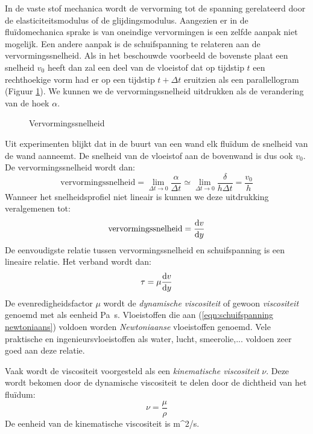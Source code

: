 In de vaste stof mechanica wordt de vervorming tot de spanning gerelateerd door de elasticiteitsmodulus of de glijdingsmodulus. Aangezien er in de fluïdomechanica sprake is van oneindige vervormingen is een zelfde aanpak niet mogelijk. Een andere aanpak is de schuifspanning te relateren aan de vervormingssnelheid. Als in het beschouwde voorbeeld de bovenste plaat een snelheid $v_0$ heeft dan zal een deel van de vloeistof dat op tijdstip $t$ een rechthoekige vorm had er op een tijdstip $t+\Delta t$ eruitzien als een parallellogram (Figuur \ref{fig:Vervormingssnelheid}). We kunnen we de vervormingssnelheid uitdrukken als de verandering van de hoek $\alpha$.
\begin{figure}[htb]
	\centering
	
	\caption{Vervormingssnelheid}
	\label{fig:Vervormingssnelheid}
\end{figure}
Uit experimenten blijkt dat in de buurt van een wand elk fluïdum de snelheid van de wand aanneemt. De snelheid van de vloeistof aan de bovenwand is dus ook $v_0$. De vervormingssnelheid wordt dan:
\begin{equation}
	\text{vervormingssnelheid} = \lim_{\Delta t \to 0} \frac{\alpha}{\Delta t} \simeq \lim_{\Delta t \to 0} \frac{\delta}{h \Delta t} = \frac{v_0}{h}
\end{equation}
Wanneer het snelheidsprofiel niet lineair is kunnen we deze uitdrukking veralgemenen tot:
\begin{equation}
	\text{vervormingssnelheid} = \frac{\mathrm{d} v}{\mathrm{d} y}
\end{equation}
De eenvoudigste relatie tussen vervormingssnelheid en schuifspanning is een lineaire relatie. Het verband wordt dan:
\begin{equation}
	\tau = \mu \frac{\mathrm{d} v}{\mathrm{d} y}
	\label{eqn:schuifspanning newtoniaans}
\end{equation}
De evenredigheidsfactor $\mu$ wordt de \emph{dynamische viscositeit} of gewoon \emph{viscositeit} genoemd met als eenheid \unit{}{Pa\ s}. Vloeistoffen die aan (\ref{eqn:schuifspanning newtoniaans}) voldoen worden \emph{Newtoniaanse} vloeistoffen genoemd. Vele praktische en ingenieursvloeistoffen als water, lucht, smeerolie,... voldoen zeer goed aan deze relatie.

Vaak wordt de viscositeit voorgesteld als een \emph{kinematische viscositeit} $\nu$. Deze wordt bekomen door de dynamische viscositeit te delen door de dichtheid van het fluïdum:
\begin{equation}
	\nu = \frac{\mu}{\rho}
\end{equation}
De eenheid van de kinematische viscositeit is \unit{}{m^2/s}.

